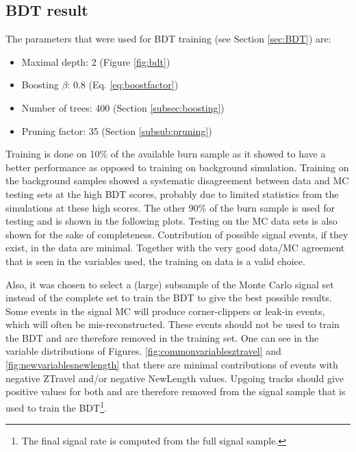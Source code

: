 \subsection{BDT result}
The parameters that were used for BDT training (see Section \ref{sec:BDT}) are:
\vspace{2mm}
\begin{itemize}
\item Maximal depth: 2 (Figure \ref{fig:bdt})
\item Boosting $\beta$: 0.8 (Eq. \ref{eq:boostfactor})
\item Number of trees: 400 (Section \ref{subsec:boosting})
\item Pruning factor: 35 (Section \ref{subsub:pruning})
\end{itemize}
\vspace{2mm}
\noindent Training is done on 10\% of the available burn sample as it showed to have a better performance as opposed to training on background simulation. Training on the background samples showed a systematic disagreement between data and MC testing sets at the high BDT scores, probably due to limited statistics from the simulations at these high scores. The other 90\% of the burn sample is used for testing and is shown in the following plots. Testing on the MC data sets is also shown for the sake of completeness. Contribution of possible signal events, if they exist, in the data are minimal. Together with the very good data/MC agreement that is seen in the variables used, the training on data is a valid choice.

Also, it was chosen to select a (large) subsample of the Monte Carlo signal set instead of the complete set to train the BDT to give the best possible results. Some events in the signal MC will produce corner-clippers or leak-in events, which will often be mis-reconstructed. These events should not be used to train the BDT and are therefore removed in the training set. One can see in the variable distributions of Figures. \ref{fig:commonvariablesztravel} and \ref{fig:newvariablesnewlength} that there are minimal contributions of events with negative ZTravel and/or negative NewLength values. Upgoing tracks should give positive values for both and are therefore removed from the signal sample that is used to train the BDT\footnote{The final signal rate is computed from the full signal sample.}.\\

